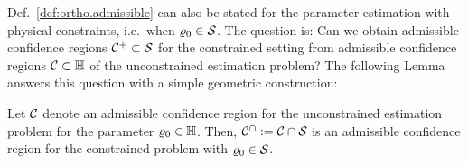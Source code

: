 Def.~\ref{def:ortho.admissible} can also be stated for the parameter estimation with physical constraints, i.e.\ when $\varrho_0 \in \mathcal{S}$.
The question is: Can we obtain admissible confidence regions $\mathcal{C}^+\subset\mathcal{S}$ for the constrained setting from admissible confidence regions $\mathcal{C}\subset\mathbb{H}$ of the unconstrained estimation problem?
The following Lemma answers this question with a simple geometric construction:
\begin{lemma}\label{lem:ortho.admissible_truncation}
  Let $\mathcal{C}$ denote an admissible confidence region for the unconstrained estimation problem for the parameter $\varrho_0 \in \mathbb{H}$.
  Then, $\mathcal{C}^\cap := \mathcal{C}\cap\mathcal{S}$ is an admissible confidence region for the constrained problem with $\varrho_0 \in \mathcal{S}$.
\end{lemma}
